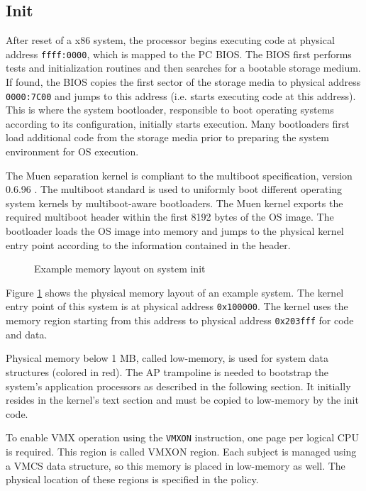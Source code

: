 \subsection{Init}\label{subsec:init}
After reset of a x86 system, the processor begins executing code at physical
address \texttt{ffff:0000}, which is mapped to the PC BIOS. The
BIOS first performs tests and initialization routines and then searches for a
bootable storage medium. If found, the BIOS copies the first sector of the
storage media to physical address \texttt{0000:7C00} and jumps to this address
(i.e. starts executing code at this address). This is where the system
bootloader, responsible to boot operating systems according to its
configuration, initially starts execution. Many bootloaders first load
additional code from the storage media prior to preparing the system
environment for OS execution.

The Muen separation kernel is compliant to the multiboot specification, version
0.6.96 \cite{multiboot}. The multiboot standard is used to uniformly boot
different operating system kernels by multiboot-aware bootloaders.  The Muen
kernel exports the required multiboot header within the first 8192 bytes of the
OS image. The bootloader loads the OS image into memory and jumps to the
physical kernel entry point according to the information contained in the
header.

\begin{figure}[h]
	\centering
	
	\caption{Example memory layout on system init}
	\label{fig:init-mem-layout-example}
\end{figure}

Figure \ref{fig:init-mem-layout-example} shows the physical memory layout of an
example system. The kernel entry point of this system is at physical address
\texttt{0x100000}. The kernel uses the memory region starting from this address
to physical address \texttt{0x203fff} for code and data.

Physical memory below 1 MB, called low-memory, is used for system data
structures (colored in red). The AP trampoline is
needed to bootstrap the system's application processors as described in the
following section. It initially resides in the kernel's text section and must
be copied to low-memory by the init code.

To enable VMX operation using the \texttt{VMXON} instruction, one page per
logical CPU is required. This region is called VMXON region. Each
subject is managed using a VMCS data structure, so this memory is
placed in low-memory as well. The physical location of these regions is
specified in the policy.

